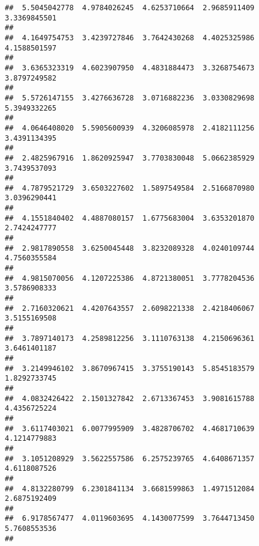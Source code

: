 \documentclass[]{article}
\begin{document}
\begin{verbatim}
##  5.5045042778  4.9784026245  4.6253710664  2.9685911409  3.3369845501 
##                                                                       
##  4.1649754753  3.4239727846  3.7642430268  4.4025325986  4.1588501597 
##                                                                       
##  3.6365323319  4.6023907950  4.4831884473  3.3268754673  3.8797249582 
##                                                                       
##  5.5726147155  3.4276636728  3.0716882236  3.0330829698  5.3949332265 
##                                                                       
##  4.0646408020  5.5905600939  4.3206085978  2.4182111256  3.4391134395 
##                                                                       
##  2.4825967916  1.8620925947  3.7703830048  5.0662385929  3.7439537093 
##                                                                       
##  4.7879521729  3.6503227602  1.5897549584  2.5166870980  3.0396290441 
##                                                                       
##  4.1551840402  4.4887080157  1.6775683004  3.6353201870  2.7424247777 
##                                                                       
##  2.9817890558  3.6250045448  3.8232089328  4.0240109744  4.7560355584 
##                                                                       
##  4.9815070056  4.1207225386  4.8721380051  3.7778204536  3.5786908333 
##                                                                       
##  2.7160320621  4.4207643557  2.6098221338  2.4218406067  3.5155169508 
##                                                                       
##  3.7897140173  4.2589812256  3.1110763138  4.2150696361  3.6461401187 
##                                                                       
##  3.2149946102  3.8670967415  3.3755190143  5.8545183579  1.8292733745 
##                                                                       
##  4.0832426422  2.1501327842  2.6713367453  3.9081615788  4.4356725224 
##                                                                       
##  3.6117403021  6.0077995909  3.4828706702  4.4681710639  4.1214779883 
##                                                                       
##  3.1051208929  3.5622557586  6.2575239765  4.6408671357  4.6118087526 
##                                                                       
##  4.8132280799  6.2301841134  3.6681599863  1.4971512084  2.6875192409 
##                                                                       
##  6.9178567477  4.0119603695  4.1430077599  3.7644713450  5.7608553536 
##                                                                       

\end{verbatim}
\end{document}
